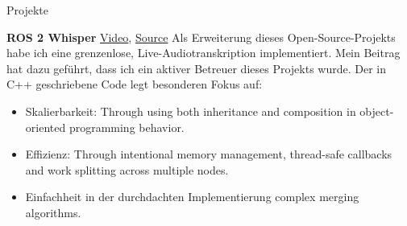 \begin{rubric}{Projekte}

\entry*[2024] \textbf{ROS 2 Whisper} \hfill \href{https://github.com/ros-ai/ros2_whisper/blob/main/doc/harry_potter_sample.gif}{Video}, \href{https://github.com/ros-ai/ros2_whisper}{\faGithub Source} \newline  
Als Erweiterung dieses Open-Source-Projekts habe ich eine grenzenlose, Live-Audiotranskription implementiert. Mein Beitrag hat dazu geführt, dass ich ein aktiver Betreuer dieses Projekts wurde. Der in C++ geschriebene Code legt besonderen Fokus auf: \newline  
\vspace{\CVItemizeHeaderSpacing} \begin{itemize}  
	\setlength{\itemsep}{\CVItemizeSpacing}  
	\item Skalierbarkeit:  Through using both inheritance and composition in object-oriented programming behavior.
	\item Effizienz:  Through intentional memory management, thread-safe callbacks and work splitting across multiple nodes.
	\item Einfachheit in der durchdachten Implementierung complex merging algorithms.
\end{itemize}  

\begin{comment}
\entry*[2024] \textbf{ROS 2 Computer Vision} \hfill \href{https://github.com/NathanCorral/ROS-HF-Vision/blob/main/doc/gifs/ex_german_roads.gif}{Video}, \href{https://github.com/NathanCorral/ROS-HF-Vision/tree/main}{\faGithub Source} \newline  
Das Ausführen mehrerer Computer-Vision-Modelle (DETR, Maskformer), die für verschiedene Datensätze/Aufgaben trainiert wurden, auf einem Live-Kamerastream stellt mehrere Implementierungsherausforderungen dar. Dieses Python-Repository bietet eine Lösung für: \newline  
\vspace{\CVItemizeHeaderSpacing} \begin{itemize}  
	\setlength{\itemsep}{\CVItemizeSpacing}  
	\item Das Herunterladen und Ausführen von State-of-the-Art-Modellen aus Hugging Face als asynchrone ROS 2 Nodes.  
	\item Das Hosten eines Label Server, um Modell-Ausgaben in einer globalen Datenbank neu zu adressieren.  
	\item Die Anzeige von Segmentation Masks und Bounding Boxes als Matplotlib Animations.  
	\item Das Veröffentlichen von Datensatzbildern zur wiederholbaren Evaluierung von CV-Modellen.  
\end{itemize}  


\end{comment}
\end{rubric}

